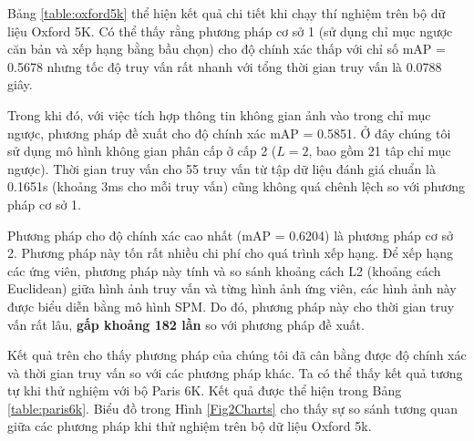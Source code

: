 Bảng \ref{table:oxford5k} thể hiện kết quả chi tiết khi chạy thí nghiệm trên bộ dữ liệu Oxford 5K. Có thể thấy rằng phương pháp cơ sở 1 (sử dụng chỉ mục ngược căn bản và xếp hạng bằng bầu chọn) cho độ chính xác thấp với chỉ số mAP = 0.5678 nhưng tốc độ truy vấn rất nhanh với tổng thời gian truy vấn là 0.0788 giây.

Trong khi đó, với việc tích hợp thông tin không gian ảnh vào trong chỉ mục ngược, phương pháp đề xuất cho độ chính xác mAP = 0.5851. Ở đây chúng tôi sử dụng mô hình không gian phân cấp ở cấp 2 ($L = 2$, bao gồm 21 tâp chỉ mục ngược). Thời gian truy vấn cho 55 truy vấn từ tập dữ liệu đánh giá chuẩn là 0.1651s (khoảng 3ms cho mỗi truy vấn) cũng không quá chênh lệch so với phương pháp cơ sở 1.

Phương pháp cho độ chính xác cao nhất (mAP = 0.6204) là phương pháp cơ sở 2. Phương pháp này tốn rất nhiều chi phí cho quá trình xếp hạng. Để xếp hạng các ứng viên, phương pháp này tính và so sánh khoảng cách L2 (khoảng cách Euclidean) giữa hình ảnh truy vấn và từng hình ảnh ứng viên, các hình ảnh này được biểu diễn bằng mô hình SPM. Do đó, phương pháp này cho thời gian truy vấn rất lâu, \textbf{gấp khoảng 182 lần} so với phương pháp đề xuất.

Kết quả trên cho thấy phương pháp của chúng tôi đã cân bằng được độ chính xác và thời gian truy vấn so với các phương pháp khác. Ta có thể thấy kết quả tương tự khi thử nghiệm với bộ Paris 6K. Kết quả được thể hiện trong Bảng \ref{table:paris6k}. Biểu đồ trong Hình \ref{Fig2Charts} cho thấy sự so sánh tương quan giữa các phương pháp khi thử nghiệm trên bộ dữ liệu Oxford 5k.


